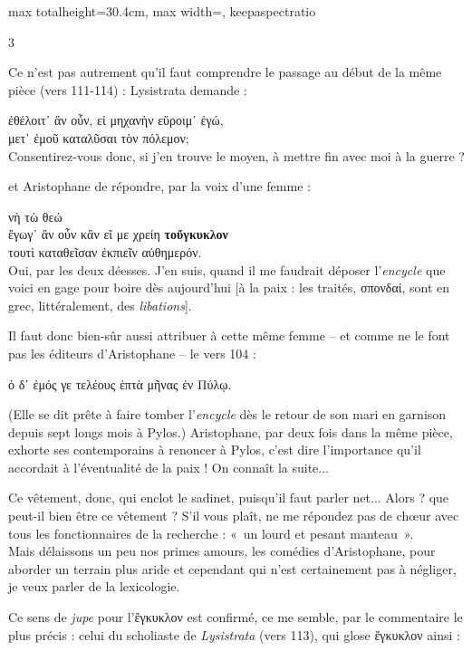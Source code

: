 \documentclass[11pt,twoside]{book}
\newcommand{\italique}[1]{\textit{#1}}
\newcommand{\citComm}[1]{\begin{quoting}[vskip=0.4pt,leftmargin=0.7em,rightmargin=0.2em]#1\end{quoting}}
\newlength{\larg}
\newcommand{\decalage}[1]{\settowidth{\larg}{#1}\hspace*{\larg}}
\begin{document}
\begin{adjustbox}{max totalheight=30.4cm, max width=\textwidth, keepaspectratio}
\begin{minipage}{\textwidth}
{\begin{multicols}{3}
\par\vspace{1.5pt}
\noindent Ce n'est pas autrement qu'il faut comprendre le passage au début de la même pièce (vers 111-114) : Lysistrata demande :
\citComm{ἐθέλοιτ᾽ ἂν οὖν, εἰ μηχανὴν εὕροιμ᾽ ἐγώ,\\
μετ᾽ ἐμοῦ καταλῦσαι τὸν πόλεμον;\\
Consentirez-vous donc, si j'en trouve le moyen, à mettre fin avec moi à la guerre ?}
\par\vspace{1.5pt}
\noindent et Aristophane de répondre, par la voix d'une femme :
\citComm{\decalage{μετ᾽ ἐμοῦ καταλῦσαι τὸν πόλεμον;}νὴ τὼ θεώ\\
ἔγωγ᾽ ἂν οὖν κἂν εἴ με χρείη \textbf{τοὔγκυκλον}\\
τουτὶ καταθεῖσαν ἐκπιεῖν αὐθημερόν.\\
Oui, par les deux déesses. J'en suis, quand il me faudrait déposer l'\italique{encycle} que voici en gage pour boire dès aujourd'hui [à la paix : les traités, σπονδαί, sont en grec, littéralement, des \italique{libations}].}
\par\vspace{1.5pt}
\noindent Il faut donc bien-sûr aussi attribuer à cette même femme -- et comme ne le font pas les éditeurs d'Aristophane -- le vers 104 :
\citComm{ὁ δ᾽ ἐμός γε τελέους ἑπτὰ μῆνας ἐν Πύλῳ.}
\par\vspace{1.5pt}
\noindent (Elle se dit prête à faire tomber l'\italique{encycle} dès le retour de son mari en garnison depuis sept longs mois à Pylos.) Aristophane, par deux fois dans la même pièce, exhorte ses contemporains à renoncer à Pylos, c'est dire l'importance qu'il accordait à l'éventualité de la paix ! On connaît la suite...
\par\vspace{1.5pt}
\noindent Ce vêtement, donc, qui enclot le sadinet, puisqu'il faut parler net... Alors ? que peut-il bien être ce vêtement ? S'il vous plaît, ne me répondez pas de chœur avec tous les fonctionnaires de la recherche : «~un lourd et pesant manteau~».\\ Mais délaissons un peu nos primes amours, les comédies d'Aristophane, pour aborder un terrain plus aride et cependant qui n'est certainement pas à négliger, je veux parler de la lexicologie.
\par\vspace{1.5pt}
\noindent Ce sens de \italique{jupe} pour l'ἔγκυκλον est confirmé, ce me semble, par le commentaire le plus précis : celui du scholiaste de \italique{Lysistrata} (vers 113), qui glose ἔγκυκλον ainsi :

\end{multicols}}
\end{minipage}
\end{adjustbox}
\end{document}
